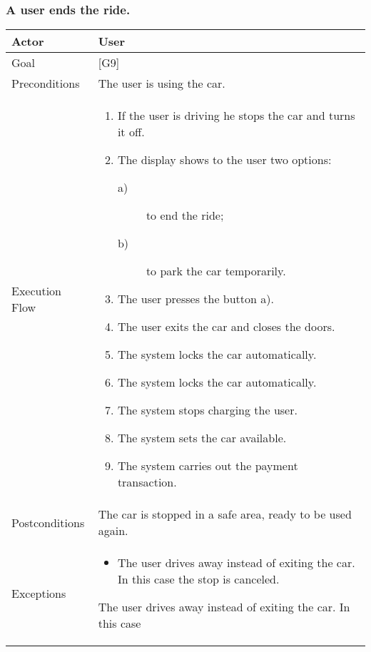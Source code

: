 \documentclass{article}
\begin{document}
  \subsubsection{A user ends the ride.}
  \begin{tabularx}{\textwidth}{  l  X  }
    \hline
    Actor & User\\
    \hline
    Goal & [G9]\\
    \hline
    Preconditions & The user is using the car.\\
    \hline
    Execution Flow & \begin{enumerate}
      \item{If the user is driving he stops the car and turns it off.}
                     \item{The display shows to the user two options:
                     \begin{description}
                              \item[a)]{ to end the ride;}
                              \item[b)]{ to park the car temporarily.}
            \end{description}}
     \item{The user presses the button a).}
     \item{The user exits the car and closes the doors.}
     \item{The system locks the car automatically.}
     \item{The system locks the car automatically.}
     \item{The system stops charging the user.}
     \item{The system sets the car available.}
     \item{The system carries out the payment transaction.}
            \end{enumerate}\\
    \hline
    Postconditions & The car is stopped in a safe area, ready to be used again.\\
    \hline
    Exceptions & \begin{itemize}
      \item{The user drives away instead of exiting the car. In this case the stop is canceled.}
    \end{itemize}The user drives away instead of exiting the car. In this case\\
    \hline
  \end{tabularx}
\end{document}
